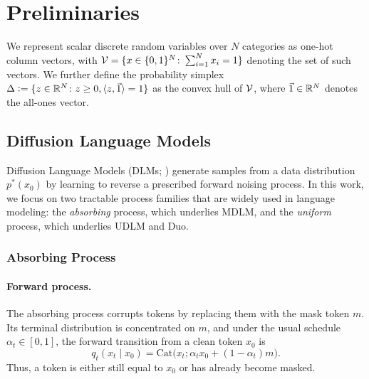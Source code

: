 
\section{Preliminaries}
\label{sec:preliminaries}

    We represent scalar discrete random variables over $N$ categories as one-hot column vectors, with ${\mathcal{V} = \{x \in \{0,1\}^N\colon \sum_{i=1}^N x_i = 1\}}$ denoting the set of such vectors. We further define the probability simplex $\Delta \vcentcolon= \{ z \in \mathbb{R}^N\colon z \ge 0, \langle z, \vec{1} \rangle = 1 \}$ as the convex hull of $\mathcal{V}$, where $\vec{1} \in \mathbb{R}^N$ denotes the all-ones vector. 

\subsection{Diffusion Language Models}
\label{sec:discrete diffusion models}
    Diffusion Language Models (DLMs; \citealp{austin2021structured, campbell2022continuous, lou2024discrete}) generate samples from a data distribution $p^*(x_0)$ by learning to reverse a prescribed forward noising process. In this work, we focus on two tractable process families that are widely used in language modeling: the \textit{absorbing} process, which underlies MDLM, and the \textit{uniform} process, which underlies UDLM and Duo. 

\subsubsection{Absorbing Process}
\label{sec:absorbing process mdlm}
    \paragraph{Forward process.}
    The absorbing process corrupts tokens by replacing them with the mask token $m$. Its terminal distribution is concentrated on $m$, and under the usual schedule $\alpha_t \in [0,1]$, the forward transition from a clean token $x_0$ is
    \[
        q_t(x_t \mid x_0)
        = \mathrm{Cat}\bigl(x_t; \alpha_t x_0 + (1-\alpha_t)m\bigr).
    \]
    Thus, a token is either still equal to $x_0$ or has already become masked.

